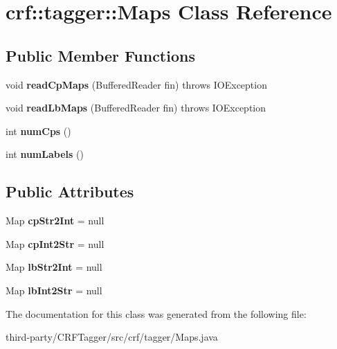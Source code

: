 \hypertarget{classcrf_1_1tagger_1_1Maps}{
\section{crf::tagger::Maps Class Reference}
\label{classcrf_1_1tagger_1_1Maps}
}
\subsection*{Public Member Functions}
\begin{DoxyCompactItemize}
\item 
\hypertarget{classcrf_1_1tagger_1_1Maps_a42c5e0a56f79f4dd302bba9f2c4bfcd0}{
void {\bfseries readCpMaps} (BufferedReader fin)  throws IOException }
\label{classcrf_1_1tagger_1_1Maps_a42c5e0a56f79f4dd302bba9f2c4bfcd0}

\item 
\hypertarget{classcrf_1_1tagger_1_1Maps_a6a609374088ae25f855221d18b0e83c8}{
void {\bfseries readLbMaps} (BufferedReader fin)  throws IOException }
\label{classcrf_1_1tagger_1_1Maps_a6a609374088ae25f855221d18b0e83c8}

\item 
\hypertarget{classcrf_1_1tagger_1_1Maps_ada1d1cad73781577aba9f2571c7c42bf}{
int {\bfseries numCps} ()}
\label{classcrf_1_1tagger_1_1Maps_ada1d1cad73781577aba9f2571c7c42bf}

\item 
\hypertarget{classcrf_1_1tagger_1_1Maps_af46341643852a6e8f23152a68839f571}{
int {\bfseries numLabels} ()}
\label{classcrf_1_1tagger_1_1Maps_af46341643852a6e8f23152a68839f571}

\end{DoxyCompactItemize}
\subsection*{Public Attributes}
\begin{DoxyCompactItemize}
\item 
\hypertarget{classcrf_1_1tagger_1_1Maps_aa0cf8f3cefbd211728038c41986b8644}{
Map {\bfseries cpStr2Int} = null}
\label{classcrf_1_1tagger_1_1Maps_aa0cf8f3cefbd211728038c41986b8644}

\item 
\hypertarget{classcrf_1_1tagger_1_1Maps_a01e525e11561ea5a199a98e7f72abc2c}{
Map {\bfseries cpInt2Str} = null}
\label{classcrf_1_1tagger_1_1Maps_a01e525e11561ea5a199a98e7f72abc2c}

\item 
\hypertarget{classcrf_1_1tagger_1_1Maps_aed053e308f75664e86a5491bd605aea7}{
Map {\bfseries lbStr2Int} = null}
\label{classcrf_1_1tagger_1_1Maps_aed053e308f75664e86a5491bd605aea7}

\item 
\hypertarget{classcrf_1_1tagger_1_1Maps_ac940ecdd104ad33085844b79d09c725b}{
Map {\bfseries lbInt2Str} = null}
\label{classcrf_1_1tagger_1_1Maps_ac940ecdd104ad33085844b79d09c725b}

\end{DoxyCompactItemize}


The documentation for this class was generated from the following file:\begin{DoxyCompactItemize}
\item 
third-\/party/CRFTagger/src/crf/tagger/Maps.java\end{DoxyCompactItemize}

